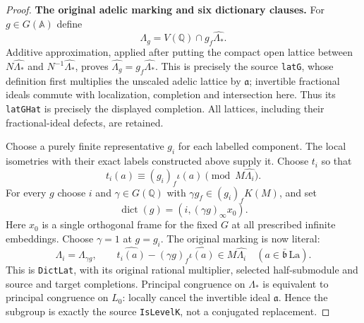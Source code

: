 \begin{proof}
\par\medskip\noindent\textbf{The original adelic marking and six dictionary clauses.}
For $g\in G(\mathbb A)$ define
\[
 \Lambda_g=V(\mathbb Q)\cap g_f\widehat{\Lambda_*}.
\]
Additive approximation, applied after putting the compact open
lattice between $N\widehat{\Lambda_*}$ and
$N^{-1}\widehat{\Lambda_*}$, proves
$\widehat{\Lambda_g}=g_f\widehat{\Lambda_*}$.
This is precisely the source \texttt{latG}, whose definition
first multiplies the unscaled adelic lattice by $\mathfrak a$;
invertible fractional ideals commute with localization,
completion and intersection here.  Thus its \texttt{latGHat}
is precisely the displayed completion.  All lattices, including
their fractional-ideal defects, are retained.

Choose a purely finite representative $g_i$ for each labelled
component.  The local isometries with their exact labels
constructed above supply it.  Choose $t_i$ so that
\[
             t_i(a)\equiv(g_i)_f\iota(a)
                       \pmod{M\widehat{\Lambda_i}} .
\]
For every $g$ choose $i$ and $\gamma\in G(\mathbb Q)$ with
$\gamma g_f\in(g_i)_fK(M)$, and set
\[
                 \operatorname{dict}(g)
                      =(i,(\gamma g)_\infty x_0).
\]
Here $x_0$ is a single orthogonal frame for the fixed $G$ at
all prescribed infinite embeddings.  Choose $\gamma=1$ at
$g=g_i$.  The original marking is now literal:
\[
 \Lambda_i=\Lambda_{\gamma g},\qquad
 \widehat{t_i(a)}-(\gamma g)_f\widehat{\iota(a)}
       \in M\widehat{\Lambda_i}
       \quad(a\in\bar{\mathfrak b}\,\mathrm{La}).
\]
This is \texttt{DictLat}, with its original rational multiplier,
selected half-submodule and source and target completions.
Principal congruence on $\Lambda_*$ is equivalent to principal
congruence on $L_0$: locally cancel the invertible ideal
$\mathfrak a$.  Hence the subgroup is exactly the source
\texttt{IsLevelK}, not a conjugated replacement.


\end{proof}
